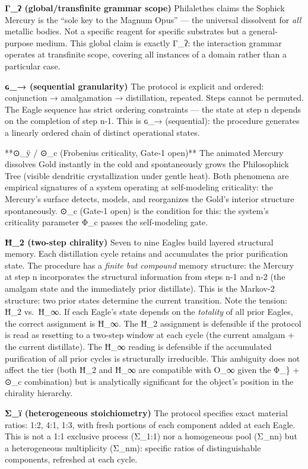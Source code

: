 \textbf{Γ\_ʔ (global/transfinite grammar scope)} Philalethes claims the
Sophick Mercury is the ``sole key to the Magnum Opus'' --- the universal
dissolvent for \emph{all} metallic bodies. Not a specific reagent for
specific substrates but a general-purpose medium. This global claim is
exactly Γ\_ʔ: the interaction grammar operates at transfinite scope,
covering all instances of a domain rather than a particular case.

\textbf{ɢ\_→ (sequential granularity)} The protocol is explicit and
ordered: conjunction → amalgamation → distillation, repeated. Steps
cannot be permuted. The Eagle sequence has strict ordering constraints
--- the state at step n depends on the completion of step n-1. This is
ɢ\_→ (sequential): the procedure generates a linearly ordered chain of
distinct operational states.

**⊙\_ÿ / ⊙\_c (Frobenius criticality, Gate-1 open)** The animated
Mercury dissolves Gold instantly in the cold and spontaneously grows the
Philosophick Tree (visible dendritic crystallization under gentle heat).
Both phenomena are empirical signatures of a system operating at
self-modeling criticality: the Mercury's surface detects, models, and
reorganizes the Gold's interior structure spontaneously. ⊙\_c (Gate-1
open) is the condition for this: the system's criticality parameter Φ\_c
passes the self-modeling gate.

\textbf{Ħ\_2 (two-step chirality)} Seven to nine Eagles build layered
structural memory. Each distillation cycle retains and accumulates the
prior purification state. The procedure has a \emph{finite but compound}
memory structure: the Mercury at step n incorporates the structural
information from steps n-1 and n-2 (the amalgam state and the
immediately prior distillate). This is the Markov-2 structure: two prior
states determine the current transition. Note the tension: Ħ\_2
vs.~Ħ\_∞. If each Eagle's state depends on the \emph{totality} of all
prior Eagles, the correct assignment is Ħ\_∞. The Ħ\_2 assignment is
defensible if the protocol is read as resetting to a two-step window at
each cycle (the current amalgam + the current distillate). The Ħ\_∞
reading is defensible if the accumulated purification of all prior
cycles is structurally irreducible. This ambiguity does not affect the
tier (both Ħ\_2 and Ħ\_∞ are compatible with O\_∞ given the Φ\_\} + ⊙\_c
combination) but is analytically significant for the object's position
in the chirality hierarchy.

\textbf{Σ\_ï (heterogeneous stoichiometry)} The protocol specifies exact
material ratios: 1:2, 4:1, 1:3, with fresh portions of each component
added at each Eagle. This is not a 1:1 exclusive process (Σ\_1:1) nor a
homogeneous pool (Σ\_nn) but a heterogeneous multiplicity (Σ\_nm):
specific ratios of distinguishable components, refreshed at each cycle.

